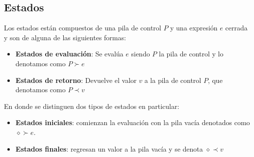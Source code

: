\subsection{Estados}
\begin{definition} Los estados están compuestos de una pila de control $P$ y una expresión $e$ cerrada y son de alguna de las siguientes formas:
\begin{itemize}
    \item {\bf Estados de evaluación}: Se evalúa $e$ siendo $P$ la pila de control y lo denotamos como $P\succ e$
    \item {\bf Estados de retorno}: Devuelve el valor $v$ a la pila de control $P$, que denotamos como $P\prec v$
\end{itemize}
En donde se distinguen dos tipos de estados en particular:
\begin{itemize}
    \item {\bf Estados iniciales}: comienzan la evaluación con la pila vacía denotados como $\diamond\succ e$.
    \item {\bf Estados finales}: regresan un valor a la pila vacía y se denota $\diamond\prec v$
\end{itemize}
\bigskip
\end{definition}

